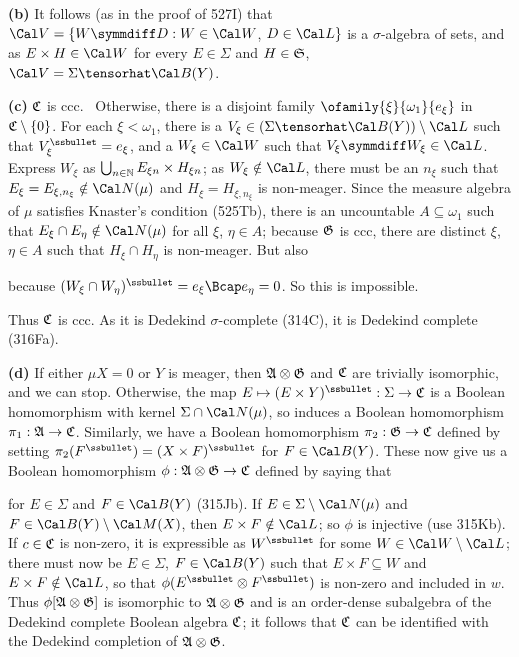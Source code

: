 {{\bf (b)} It follows (as in the proof of 527I) that
$\Cal V=\{W\symmdiff D:W\in\Cal W$, $D\in\Cal L\}$ is a $\sigma$-algebra of sets, and as
$E\times H\in\Cal W$ for every $E\in\Sigma$ and $H\in\frak S$,
$\Cal V=\Sigma\tensorhat\Cal B(Y)$.

\medskip

{\bf (c)} $\frak C$ is ccc.
\Prf\Quer\ Otherwise, there is a disjoint family $\ofamily{\xi}{\omega_1}{e_{\xi}}$
in $\frak C\setminus\{0\}$.   For each $\xi<\omega_1$, there is a
$V_{\xi}\in(\Sigma\tensorhat\Cal B(Y))\setminus\Cal L$ such that
$V_{\xi}^{\ssbullet}=e_{\xi}$, and a $W_{\xi}\in\Cal W$ such that
$V_{\xi}\symmdiff W_{\xi}\in\Cal L$.   Express $W_{\xi}$ as
$\bigcup_{n\in\Bbb N}E_{\xi n}\times H_{\xi n}$;  as $W_{\xi}\notin\Cal L$, there must
be an $n_{\xi}$ such that $E_{\xi}=E_{\xi,n_{\xi}}\notin\Cal N(\mu)$ and
$H_{\xi}=H_{\xi,n_{\xi}}$ is non-meager.    Since the measure algebra of
$\mu$ satisfies Knaster's condition (525Tb), there is an uncountable
$A\subseteq\omega_1$ such that $E_{\xi}\cap E_{\eta}\notin\Cal N(\mu)$
for all $\xi$, $\eta\in A$;  because
$\frak G$ is ccc, there are distinct $\xi$, $\eta\in A$ such that
$H_{\xi}\cap H_{\eta}$ is non-meager.   But also


\noindent because
$(W_{\xi}\cap W_{\eta})^{\ssbullet}=e_{\xi}\Bcap e_{\eta}=0$.
So this is impossible.\ \Bang\Qed

Thus $\frak C$ is ccc.   As it is Dedekind $\sigma$-complete (314C), it is Dedekind
complete (316Fa).

\medskip

{\bf (d)} If either $\mu X=0$ or $Y$ is meager, then
$\frak A\otimes\frak G$ and $\frak C$ are trivially isomorphic, and we can
stop.   Otherwise,
the map $E\mapsto(E\times Y)^{\ssbullet}:\Sigma\to\frak C$ is a Boolean
homomorphism with kernel $\Sigma\cap\Cal N(\mu)$, so induces a Boolean
homomorphism
$\pi_1:\frak A\to\frak C$.   Similarly, we have a Boolean homomorphism
$\pi_2:\frak G\to\frak C$ defined by setting
$\pi_2(F^{\ssbullet})=(X\times F)^{\ssbullet}$ for $F\in\Cal B(Y)$.
These now give
us a Boolean homomorphism $\phi:\frak A\otimes\frak G\to\frak C$ defined
by saying that


\noindent for $E\in\Sigma$ and $F\in\Cal B(Y)$ (315Jb).   If
$E\in\Sigma\setminus\Cal N(\mu)$ and $F\in\Cal B(Y)\setminus\Cal M(X)$,
then $E\times F\notin\Cal L$;  so $\phi$ is injective
(use 315Kb).   If $c\in\frak C$ is
non-zero, it is expressible as $W^{\ssbullet}$ for some
$W\in\Cal W\setminus\Cal L$;
there must now be $E\in\Sigma$, $F\in\Cal B(Y)$ such that
$E\times F\subseteq W$ and $E\times F\notin\Cal L$, so that
$\phi(E^{\ssbullet}\otimes F^{\ssbullet})$ is
non-zero and included in $w$.
Thus $\phi[\frak A\otimes\frak G]$ is isomorphic to
$\frak A\otimes\frak G$ and is an order-dense
subalgebra of the Dedekind complete Boolean algebra $\frak C$;
it follows that
$\frak C$ can be identified with the Dedekind completion of
$\frak A\otimes\frak G$.
}%

